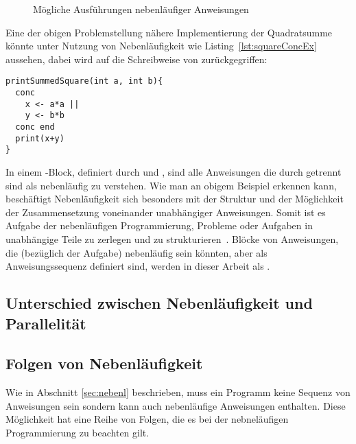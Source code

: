 \begin{figure}[hbt]
\begin{subfigure}{\textwidth}
\begin{tikzpicture}
\end{tikzpicture}
\end{subfigure}

\caption{Mögliche Ausführungen nebenläufiger Anweisungen}\label{fig:concAnweisungen}
\end{figure}

Eine der obigen Problemstellung nähere Implementierung der Quadratsumme könnte unter Nutzung von Nebenläufigkeit wie Listing~\ref{lst:squareConcEx} aussehen, dabei wird auf die Schreibweise von \textcite{Herrtwich1989} zurückgegriffen:
\begin{lstlisting}[caption={Beispiel eines Programms mit nebenläufigem Code in einem \code{conc}-Block. Das Programm gibt die Summe von zwei Quadratzahlen aus, wobei die Berechnung der Quadratzahlen nebenläufig stattfindet.}, label={lst:squareConcEx}]
printSummedSquare(int a, int b){
  conc 
    x <- a*a ||
    y <- b*b
  conc end
  print(x+y)
}
\end{lstlisting}
In einem -Block, definiert durch  und , sind alle Anweisungen die durch \code{||} getrennt sind als nebenläufig zu verstehen. Wie man an obigem Beispiel erkennen kann, beschäftigt Nebenläufigkeit sich besonders mit der Struktur und der Möglichkeit der Zusammensetzung voneinander unabhängiger Anweisungen. Somit ist es Aufgabe der nebenläufigen Programmierung, Probleme oder Aufgaben in unabhängige Teile zu zerlegen und zu strukturieren~\cite{Pike2012,Hettel2016}. Blöcke von Anweisungen, die (bezüglich der Aufgabe) nebenläufig sein könnten, aber als Anweisungssequenz definiert sind, werden in dieser Arbeit als . 

\subsection{Unterschied zwischen Nebenläufigkeit und Parallelität}

\subsection{Folgen von Nebenläufigkeit}
Wie in Abschnitt \ref{sec:nebenl} beschrieben, muss ein Programm keine Sequenz von Anweisungen sein sondern kann auch nebenläufige Anweisungen enthalten. Diese Möglichkeit hat eine Reihe von Folgen, die es bei der nebneläufigen Programmierung zu beachten gilt.
